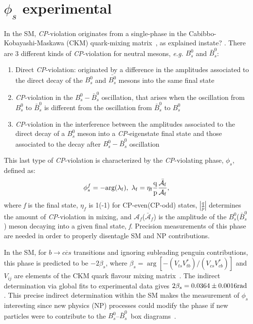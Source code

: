 \section{$\phi_s$ experimental} %
\label{sec:phisEXP}

In the SM, \textit{CP}-violation originates from a single-phase in the Cabibbo-Kobayashi-Maskawa (CKM) quark-mixing matrix~\cite{Charles:2011va}, as explained instate? . There are 3 different kinds of \textit{CP}-violation for neutral mesons, \textit{e.g.} $B_s^0$ and $\bar{B}_s^0$:
\begin{enumerate}
\item Direct \textit{CP}-violation: originated by a difference in the amplitudes associated to the direct decay of the $B_s^0$ and $\bar{B_s^0}$ mesons into the same final state %
\item \textit{CP}-violation in the $B_s^0- \bar{B}_s^0$ oscillation, that arises when the oscillation from $B_s^0$ to $\bar{B}_s^0$ is different from the oscillation from $\bar{B}_s^0$ to $B_s^0$
\item \textit{CP}-violation in the interference between the amplitudes  associated to the direct decay of a $B_s^0$ meson into a \textit{CP}-eigenstate final state and those associated to the decay after $B_s^0- \bar{B}_s^0$ oscillation
\end{enumerate} 
This last type of \textit{CP}-violation is characterized by the \textit{CP}-violating phase, $\phi_s$, defined as:
\begin{equation}
 \label{eq:phis}
\phi_s^f = -\rm arg(\lambda_f),\ \lambda_f = \eta_f \frac{q}{p}\frac{\bar{\mathcal{A}}_f}{\mathcal{A}_f},
\end{equation}
where \textit{f} is the final state, $\eta_f$ is 1(-1) for CP-even(CP-odd) states, $\left| \frac{q}{p} \right |$ determines the amount of \textit{CP}-violation in mixing, and ${\mathcal{A}}_f$($\bar{\mathcal{A}}_f$) is the amplitude of the $B_s^0$($\bar{B}_s^0$) meson decaying into a given final state, \textit{f}.
Precision measurements of this phase are needed in order to properly disentagle SM and NP contributions.

 In the SM, for $b\to c\overline{c}s$ transitions and ignoring subleading penguin contributions, this phase is predicted to be $-2\beta_s$, where $\beta_s=\arg\left[
 - (V_{ts} V_{tb}^*) / (V_{cs} V_{cb}^*)\right]$ and $V_{ij}$ are elements of the CKM quark flavour mixing
 matrix~\cite{Kobayashi:1973fv,*Cabibbo:1963yz}. The indirect determination via global fits to experimental data gives
 \mbox{$2\beta_s=0.0364\pm0.0016\rm rad$}. This precise indirect determination within the SM makes the
 measurement of $\phi_s$ interesting since new physics (NP) processes could modify
 the phase if new particles were to contribute to the $B_s^0$--$\bar{B}_s^0$\ box diagrams~\cite{Buras:2009if,Chiang:2009ev}.
 
